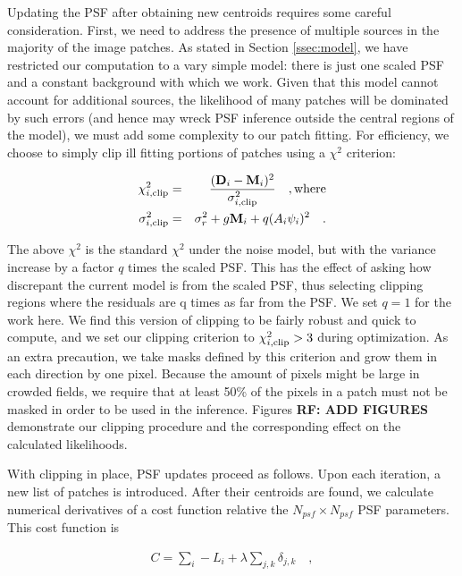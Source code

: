 \documentclass[12pt,letterpaper,preprint]{aastex}
\newcommand{\rf}[1]{\textbf{RF: #1}}
\newcommand{\vect}[1]{\mathbf{#1}}
\newcommand{\data}{\vect{D}}
\newcommand{\model}{\vect{M}}
\newcommand{\psf}{\vect{\psi}}
\newcommand{\var}{\vect{\sigma}^2}
\begin{document}
Updating the PSF after obtaining new centroids requires some careful consideration.  First, 
we need to address the presence of multiple sources in the majority of the image patches.  As 
stated in Section \ref{ssec:model}, we have restricted our computation to a vary simple model: 
there is just one scaled PSF and a constant background with which we work.  Given that this 
model cannot account for additional sources, the likelihood of many patches will be dominated 
by such errors (and hence may wreck PSF inference outside the central regions of the model), 
we must add some complexity to our patch fitting.  For efficiency, we choose to simply clip ill 
fitting portions of patches using a $\chi^2$ criterion:

\begin{eqnarray}
\chi^2_{i, {\rm clip}} &=& \frac{(\data_i - \model_i)^2}{\var_{i, {\rm clip}}} \quad , {\rm where} \\
\var_{i, {\rm clip}} &=&  \sigma_{r}^2 + g \model_i + q (A_i \psf_i)^2
\quad .
\label{eqn:chi2-clip}
\end{eqnarray}

\noindent  The above $\chi^2$ is the standard $\chi^2$  under the noise model, but with the
variance increase by a factor $q$ times the scaled PSF.  This has the effect of asking how 
discrepant the current model is from the scaled PSF, thus selecting clipping regions where 
the residuals are q times as far from the PSF.  We set $q=1$ for the work here.  We find this 
version of clipping to be fairly robust and quick 
to compute, and we set our clipping criterion to $\chi^2_{i, {\rm clip}} > 3$ during optimization.  As 
an extra precaution, we take masks defined by this criterion and grow them in each direction 
by one pixel.  Because the amount of pixels might be large in crowded fields, we require that 
at least 50\% of the pixels in a patch must not be masked in order to be used in the inference.  
Figures \rf{ADD FIGURES} demonstrate our clipping procedure and the corresponding effect 
on the calculated likelihoods.

With clipping in place, PSF updates proceed as follows.  Upon each iteration, a new list of 
patches is introduced.  After their centroids are found, we calculate numerical derivatives of 
a cost function relative the $N_{psf} \times N_{psf}$ PSF parameters.  This cost function is

\begin{eqnarray}
C = \sum_i -L_i + \lambda \sum_{j, k} \delta_{j, k}
\quad ,
\label{eqn:patch-likelihood}
\end{eqnarray}
\end{document}
